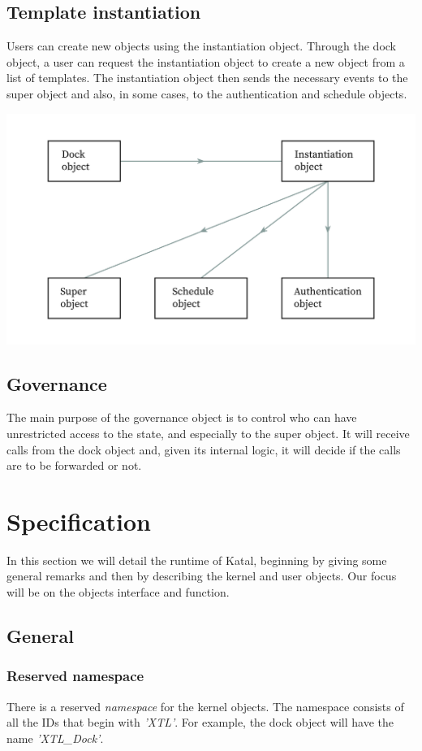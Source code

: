 \documentclass[conference]{IEEEtran}
\begin{document}
\subsection{Template instantiation}
Users can create new objects using the instantiation object. Through the dock object, a user can request the instantiation object to create a new object from a list of templates. The instantiation object then sends the necessary events to the super object and also, in some cases, to the authentication and schedule objects.

\includegraphics[width=\linewidth]{images/instantiating.jpg}

\subsection{Governance}
The main purpose of the governance object is to control who can have unrestricted access to the state, and especially to the super object. It will receive calls from the dock object and, given its internal logic, it will decide if the calls are to be forwarded or not.

\section{Specification}
In this section we will detail the runtime of Katal, beginning by giving some general remarks and then by describing the kernel and user objects. Our focus will be on the objects interface and function.

\subsection{General}

\subsubsection{Reserved namespace}
There is a reserved \textit{namespace} for the kernel objects. The namespace consists of all the IDs that begin with \textit{'XTL'}. For example, the dock object will have the name \textit{'XTL\_Dock'}.
\end{document}
